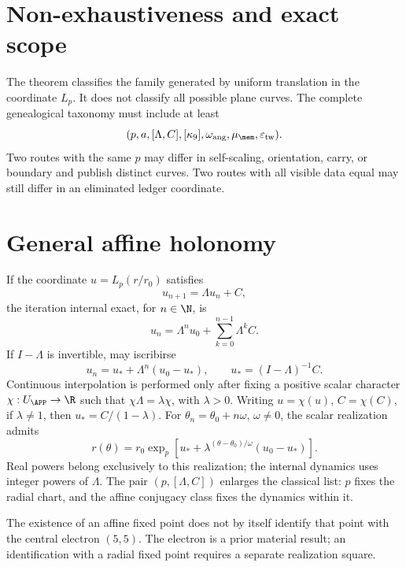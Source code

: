 \section{Non-exhaustiveness and exact scope}

The theorem classifies the family generated by uniform translation in the
coordinate \(L_p\). It does not classify all possible plane curves. The
complete genealogical taxonomy must include at least
\[
 (p,a,[\Lambda,C],[\kappa_9],
 \omega_{\mathrm{ang}},\mu_{\mem},\varepsilon_{\mathrm{tw}}).
\]
Two routes with the same \(p\) may differ in self-scaling, orientation,
carry, or boundary and publish distinct curves. Two routes with all visible
data equal may still differ in an eliminated ledger coordinate.

\section{General affine holonomy}

If the coordinate \(u=L_p(r/r_0)\) satisfies
\[
 u_{n+1}=\Lambda u_n+C,
\]
the iteration internal exact, for \(n\in\N\), is
\[
 u_n=\Lambda^n u_0+\sum_{k=0}^{n-1}\Lambda^kC.
\]
If \(I-\Lambda\) is invertible, may iscribirse
\[
 u_n=u_*+\Lambda^n(u_0-u_*),
 \qquad u_*=(I-\Lambda)^{-1}C.
\]
Continuous interpolation is performed only after fixing a positive
scalar character \(\chi:U_{\APP}\to\R\) such that
\(\chi\Lambda=\lambda\chi\), with \(\lambda>0\). Writing
\(u=\chi(u)\), \(C=\chi(C)\), if \(\lambda\neq1\), then
\(u_*=C/(1-\lambda)\). For \(\theta_n=\theta_0+n\omega\),
\(\omega\neq0\), the scalar realization admits
\begin{equation}
 r(\theta)=r_0\exp_p\!\left[
 u_*+\lambda^{(\theta-\theta_0)/\omega}(u_0-u_*)
 \right].
 \label{espiral:eq:familia-afin-general}
\end{equation}
Real powers belong exclusively to this realization; the
internal dynamics uses integer powers of \(\Lambda\). The pair
\((p,[\Lambda,C])\) enlarges the classical list: \(p\) fixes the radial chart, and
the affine conjugacy class fixes the dynamics within it.

\begin{remark}
The existence of an affine fixed point does not by itself identify that point with the
central electron \((5,5)\). The electron is a prior material result; an
identification with a radial fixed point requires a separate realization
square.
\end{remark}

